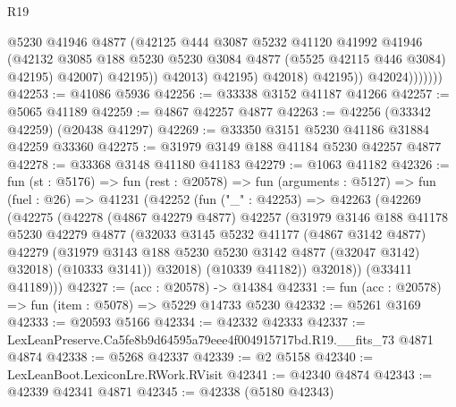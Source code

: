 \begin{lexlean}{R19}
\begin{coremodule}
                                @5230
                                @41946
                                @4877
                                (@42125
                                  @444
                                  @3087
                                  @5232
                                  @41120
                                  @41992
                                  @41946
                                  (@42132
                                    @3085
                                    @188
                                    @5230
                                    @5230
                                    @3084
                                    @4877
                                    (@5525 @42115 @446 @3084)
                                    @42195)
                                  @42007)
                                @42195))
                            @42013)
                          @42195)
                        @42018)
                      @42195))
                  @42024)))))))
@42253 := @41086 @5936
@42256 := @33338 @3152 @41187 @41266
@42257 := @5065 @41189
@42259 := @4867 @42257 @4877
@42263 := @42256 (@33342 @42259) (@20438 @41297)
@42269 := @33350 @3151 @5230 @41186 @31884 @42259 @33360
@42275 := @31979 @3149 @188 @41184 @5230 @42257 @4877
@42278 := @33368 @3148 @41180 @41183
@42279 := @1063 @41182
@42326 := fun (st : @5176) =>
  fun (rest : @20578) =>
  fun (arguments : @5127) =>
  fun (fuel : @26) =>
  @41231
    (@42252
      (fun ("_" : @42253) =>
      @42263
        (@42269
          (@42275
            (@42278
              (@4867 @42279 @4877)
              @42257
              (@31979
                @3146
                @188
                @41178
                @5230
                @42279
                @4877
                (@32033
                  @3145
                  @5232
                  @41177
                  (@4867 @3142 @4877)
                  @42279
                  (@31979 @3143 @188 @5230 @5230 @3142 @4877 (@32047 @3142) @32018)
                  (@10333 @3141))
                @32018)
              (@10339 @41182))
            @32018))
        (@33411 @41189)))
@42327 := (acc : @20578) -> @14384
@42331 := fun (acc : @20578) => fun (item : @5078) => @5229 @14733 @5230
@42332 := @5261 @3169
@42333 := @20593 @5166
@42334 := @42332 @42333
@42337 := LexLeanPreserve.Ca5fe8b9d64595a79eee4f004915717bd.R19.__fits_73 @4871 @4874
@42338 := @5268 @42337
@42339 := @2 @5158
@42340 := LexLeanBoot.LexiconLre.RWork.RVisit
@42341 := @42340 @4874
@42343 := @42339 @42341 @4871
@42345 := @42338 (@5180 @42343)

\end{coremodule}
\end{lexlean}
